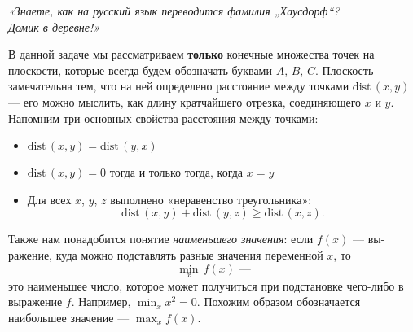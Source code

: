﻿\vfill\eject
{}
\def\dist{\mathrm{dist}\,} \def\l#1{\limits_{#1}}
\def\Dist{\mathrm{DIST}\,}

\begin{flushright} \itshape
	«Знаете, как на русский язык переводится фамилия „Хаусдорф“? \\
	Домик в деревне!»
\end{flushright}

\ms В данной задаче мы рассматриваем {\bfseries только} конечные множества точек на плоскости, которые всегда будем обозначать буквами $A$, $B$, $C$. Плоскость замечательна тем, что на ней определено расстояние между точками $\dist (x,y)$ — его можно мыслить, как длину кратчайшего отрезка, соединяющего $x$ и $y$. Напомним три основных свойства расстояния между точками:

\vspace{-0.15cm}
\begin{itemize}
	\item $\dist (x,y) = \dist (y,x)$\scolon
	\item $\dist (x,y) = 0$ тогда и только тогда, когда $x=y$\scolon
	\item Для всех $x$, $y$, $z$ выполнено «неравенство треугольника»:
		\vspace{-0.2cm} $$\dist (x,y) + \dist (y,z) \geq \dist (x,z).$$
\end{itemize}

\vspace{-0.4cm}
\ms Также нам понадобится понятие {\itshape наименьшего значения}: если $f(x)$ — вы- ражение, куда можно подставлять разные значения переменной $x$, то
	$$\min_x\,f(x)\text{\ \ —}$$
это наименьшее число, которое может получиться при подстановке чего-либо в выражение $f$. Например, $\min_x x^2 = 0$. Похожим образом обозначается наибольшее значение — $\max_x f(x)$.

